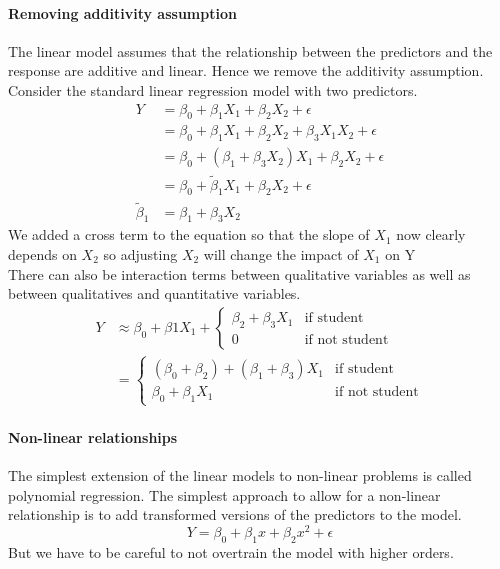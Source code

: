 \documentclass[../document.tex]{subfiles}
\begin{document}
	\paragraph{Removing additivity assumption}
	The linear model assumes that the relationship between the predictors and the response are additive and linear. Hence we remove the additivity assumption. \\
	Consider the standard linear regression model with two predictors.
	\begin{equation}
	\begin{split}
		Y &= \beta_{0}+\beta_{1}X_{1}+\beta_{2}X_{2}+\epsilon\\
		&=\beta_{0}+\beta_{1}X_{1}+\beta_{2}X_{2}+\beta_{3}X_{1}X_{2}+\epsilon\\
		&=\beta_{0}+(\beta_{1}+\beta_{3}X_{2})X_{1}+\beta_{2}X_{2}+\epsilon\\
		&=\beta_{0}+\tilde{\beta}_{1}X_{1}+\beta_{2}X_{2}+\epsilon\\
		\tilde{\beta}_{1}&=\beta_{1}+\beta_{3}X_{2}
	\end{split}
	\end{equation}
	We added a cross term to the equation so that the slope of \(X_{1}\) now clearly depends on \(X_{2}\) so adjusting \(X_{2}\) will change the impact of \(X_{1}\) on Y\\
	There can also be interaction terms between qualitative variables as well as between qualitatives and quantitative variables.
	\begin{equation}
	\begin{split}
		Y &\approx \beta_{0}+\beta{1}X_{1}+\begin{cases}
			\beta_{2}+\beta_{3}X_{1} &\text{if student}\\
			0 &\text{if not student}
		\end{cases}\\
		&=\begin{cases}
			(\beta_{0}+\beta_{2})+(\beta_{1}+\beta_{3})X_{1} &\text{if student}\\
			\beta_{0}+\beta_{1}X_{1} &\text{if not student}
		\end{cases}
	\end{split}
	\end{equation}
	\paragraph{Non-linear relationships}
	The simplest extension of the linear models to non-linear problems is called polynomial regression. The simplest approach to allow for a non-linear relationship is to add transformed versions of the predictors to the model. 
	\begin{equation}
		Y = \beta_{0}+\beta_{1}x+\beta_{2}x^2+\epsilon
	\end{equation} 
	But we have to be careful to not overtrain the model with higher orders.
\end{document}
